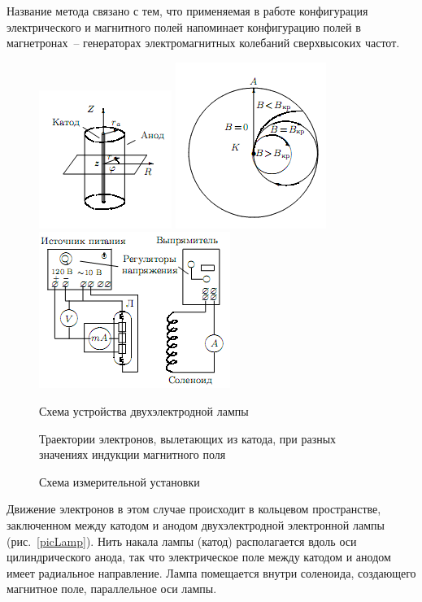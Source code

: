 \documentclass[pscyr,titlepage]{hedreport}
\begin{document}
  Название метода связано с тем, что применяемая в работе конфигурация
  электрического и магнитного полей напоминает конфигурацию полей в
  магнетронах~-- генераторах электромагнитных колебаний сверхвысоких частот.

  \begin{figure}[ht]
    \center
    \includegraphics{sl_8_1} \hspace{1em}
    \includegraphics{sl_8_2} \hspace{1em}
    \includegraphics{sl_8_3} \\
    \parbox{10em}{\caption{Схема устройства двухэлектродной лампы}
      \label{picLamp}} \hspace{1ex}
    \parbox{10em}{\caption{Траектории электронов, вылетающих из катода, при
      разных значениях индукции магнитного поля} \label{picElsFly}} \hspace{1ex}
    \parbox{13em}{\caption{Схема измерительной установки} \label{picSchem}}
  \end{figure}

  Движение электронов в этом случае происходит в кольцевом пространстве,
  заключенном между катодом и анодом двухэлектродной электронной лампы
  (рис.~\ref{picLamp}). Нить накала лампы (катод) располагается вдоль оси
  цилиндрического анода, так что электрическое поле между катодом и анодом имеет
  радиальное направление. Лампа помещается внутри соленоида, создающего
  магнитное поле, параллельное оси лампы.
\end{document}
